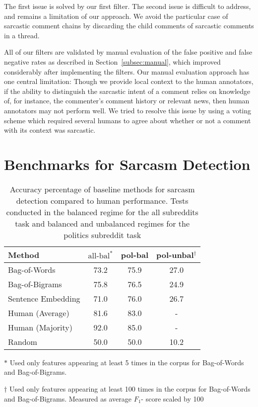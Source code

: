 \documentclass[10pt, a4paper]{article}
\begin{document}
\begin{itemize}
The first issue is solved by our first filter. The second issue is difficult to address, and remains a limitation of our approach. We avoid the particular case of sarcastic comment chains by discarding the child comments of sarcastic comments in a thread.

\end{itemize}

All of our filters are validated by manual evaluation of the false positive and false negative rates as described in Section~\ref{subsec:manual}, which improved considerably after implementing the filters. Our manual evaluation approach has one central limitation: Though we provide local context to the human annotators, if the ability to distinguish the sarcastic intent of a comment relies on knowledge of, for instance, the commenter's comment history or relevant news, then human annotators may not perform well. We tried to resolve this issue by using a voting scheme which required several humans to agree about whether or not a comment with its context was sarcastic. 


 


\section{Benchmarks for Sarcasm Detection}
\label{sec:detect}

\begin{table}[!t]
	\centering
	\begin{threeparttable}
		\begin{tabular}{@{}lccc@{}}
			Method & $\textrm{all-bal}^\ast$ & pol-bal & pol-unbal$^\dagger$ \\
			\toprule
			Bag-of-Words & 73.2 & 75.9 & 27.0\\
			Bag-of-Bigrams & 75.8 & 76.5 & 24.9\\
			Sentence Embedding & 71.0 & 76.0 & 26.7\\
			Human (Average) & 81.6 & 83.0 & -\\
			Human (Majority) & 92.0 & 85.0 & -\\
			Random & 50.0 & 50.0 & 10.2\\
			\bottomrule
		\end{tabular}
	\begin{tablenotes}
		\item[$\ast$] Used only features appearing at least 5 times in the corpus for Bag-of-Words and Bag-of-Bigrams.
		\item[$\dagger$] Used only features appearing at least 100 times in the corpus for Bag-of-Words and Bag-of-Bigrams. Measured as average $F_1$- score scaled by 100
	\end{tablenotes}
	\end{threeparttable}
		\caption{\label{tbl:performance}Accuracy percentage of baseline methods for sarcasm detection compared to human performance. Tests conducted in the balanced regime for the all subreddits task and balanced and unbalanced regimes for the politics subreddit task}
\end{table}
\end{document}
